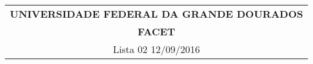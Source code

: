 \documentclass[a4paper,5pt]{amsbook}
\numberwithin{equation}{chapter}
\begin{document}
\thispagestyle{empty}
\begin{minipage}[b]{0.45\linewidth}
\begin{tabular}{c}
\hline \hline
{{\bf UNIVERSIDADE FEDERAL DA GRANDE DOURADOS}}\\

{{\bf FACET}} \\

\hline
Lista 02\hspace{12 cm}  12/09/2016  \\
\hline \hline
\end{tabular}
%
\end{minipage} 

\vspace{0.2cm}
 
\end{document}
